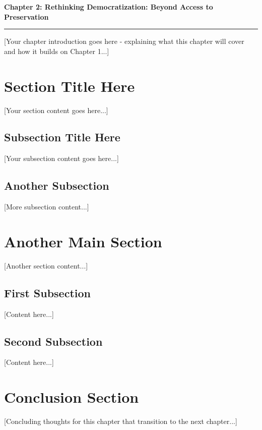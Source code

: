 \clearpage
\setcounter{chapter}{2}
\setcounter{section}{0}


\pagestyle{fancy}
\fancyhf{} %
\fancyfoot[C]{\thepage} %
\renewcommand{\headrulewidth}{0pt}
\renewcommand{\footrulewidth}{0pt}

\noindent
{\Large\textbf{Chapter 2: Rethinking Democratization: Beyond Access to Preservation}}
\vspace{0.3cm}
\hrule
\vspace{0.8cm}
\label{ch:democratization}

\setlength{\parindent}{0pt}

[Your chapter introduction goes here - explaining what this chapter will cover and how it builds on Chapter 1...]

\section{Section Title Here}

[Your section content goes here...]

\subsection{Subsection Title Here}

[Your subsection content goes here...]

\subsection{Another Subsection}

[More subsection content...]

\section{Another Main Section}

[Another section content...]

\subsection{First Subsection}

[Content here...]

\subsection{Second Subsection}

[Content here...]

\section{Conclusion Section}

[Concluding thoughts for this chapter that transition to the next chapter...]